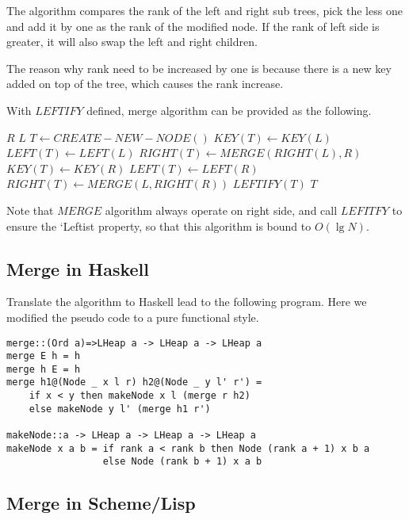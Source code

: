\documentclass{article}
\begin{document}
The algorithm compares the rank of the left and
right sub trees, pick the less one and add it by one as the 
rank of the modified node. If the rank of left side is greater,
it will also swap the left and right children.

The reason why rank need to be increased by one is because there
is a new key added on top of the tree, which causes the rank 
increase.

With $LEFTIFY$ defined, merge algorithm can be provided as the
following.

\begin{algorithmic}[1]
    \State \Return $R$
    \State \Return $L$
  \Else
    \State $T \gets CREATE-NEW-NODE()$
      \State $KEY(T) \gets KEY(L)$
      \State $LEFT(T) \gets LEFT(L)$
      \State $RIGHT(T) \gets MERGE(RIGHT(L), R)$
    \Else
      \State $KEY(T) \gets KEY(R)$
      \State $LEFT(T) \gets LEFT(R)$
      \State $RIGHT(T) \gets MERGE(L, RIGHT(R))$
    \EndIf
    \State $LEFTIFY(T)$
  \EndIf
  \State \Return $T$
\EndFunction
\end{algorithmic}

Note that $MERGE$ algorithm always operate on right side, and call
$LEFITFY$ to ensure the `Leftist property, so that this algorithm
is bound to $O(\lg N)$.

\subsection*{Merge in Haskell}

Translate the algorithm to Haskell lead to the following program.
Here we modified the pseudo code to a pure functional style.

\lstset{language=Haskell}
\begin{lstlisting}
merge::(Ord a)=>LHeap a -> LHeap a -> LHeap a
merge E h = h
merge h E = h
merge h1@(Node _ x l r) h2@(Node _ y l' r') = 
    if x < y then makeNode x l (merge r h2)
    else makeNode y l' (merge h1 r')

makeNode::a -> LHeap a -> LHeap a -> LHeap a
makeNode x a b = if rank a < rank b then Node (rank a + 1) x b a
                 else Node (rank b + 1) x a b
\end{lstlisting}

\subsection*{Merge in Scheme/Lisp}
\end{document}
